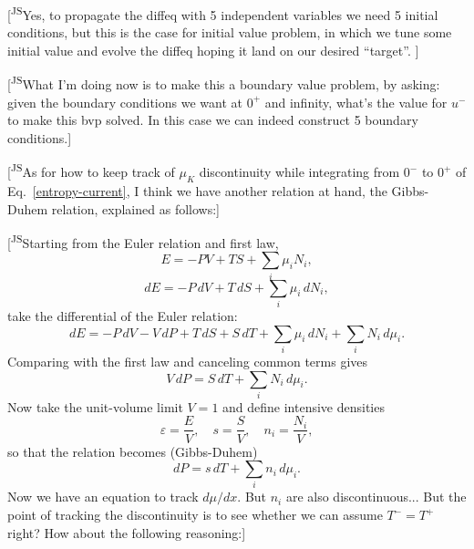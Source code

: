 \documentclass[11pt]{article}
\newcommand{\JScom}[1]{\textsf{\color{violet} [\textsuperscript{JS}#1]}}
\begin{document}
\iffalse
\JScom{Yes, to propagate the diffeq with 5 independent variables we need 5 initial conditions, but this is the case for initial value problem, in which we tune some initial value and evolve the diffeq hoping it land on our desired ``target''. }

\JScom{What I'm doing now is to make this a boundary value problem, by asking: given the boundary conditions we want at $0^+$ and infinity, what's the value for $u^-$ to make this bvp solved. In this case we can indeed construct 5 boundary conditions.}

\JScom{As for how to keep track of $\mu_K$ discontinuity while integrating from $0^-$ to $0^+$ of Eq.~\eqref{entropy-current}, I think we have another relation at hand, the Gibbs-Duhem relation, explained as follows:}

\JScom{Starting from the Euler relation and first law,
$$
E=-PV+TS+\sum_i \mu_i N_i,
$$
$$
dE=-P\,dV+T\,dS+\sum_i \mu_i\,dN_i,
$$
take the differential of the Euler relation:
$$
dE=-P\,dV - V\,dP + T\,dS + S\,dT + \sum_i \mu_i\,dN_i + \sum_i N_i\,d\mu_i.
$$
Comparing with the first law and canceling common terms gives
$$
V\,dP=S\,dT+\sum_i N_i\,d\mu_i.
$$
Now take the unit-volume limit $V=1$ and define intensive densities
$$
\varepsilon=\frac{E}{V},\quad s=\frac{S}{V},\quad n_i=\frac{N_i}{V},
$$
so that the relation becomes (Gibbs-Duhem)
$$
dP=s\,dT+\sum_i n_i\,d\mu_i.
$$
Now we have an equation to track $d\mu/dx$. But $n_i$ are also discontinuous... But the point of tracking the discontinuity is to see whether we can assume $T^- = T^+$ right? How about the following reasoning:}
\end{document}
